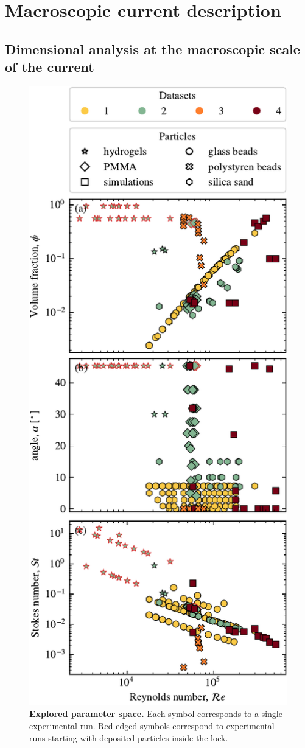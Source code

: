 \documentclass[12pt]{article}
\begin{document}
\section{Macroscopic current description}
\label{sec:current_description}
\subsection{Dimensional analysis at the macroscopic scale of the current}
\label{sec:dimensionlessmap}

\begin{figure}
	\centering
	\includegraphics{figure2.pdf}
	\caption{\textbf{Explored parameter space.} Each symbol corresponds to a single experimental run. Red-edged symbols correspond to experimental runs starting with deposited particles inside the lock.}
	\label{fig:fig2}
\end{figure}
\end{document}
